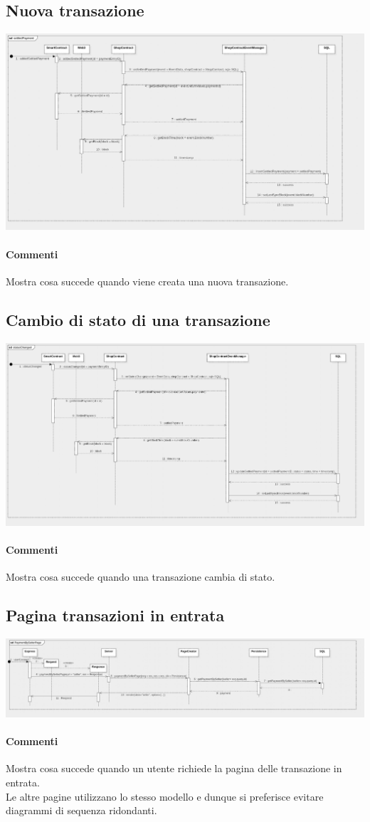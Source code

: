 \documentclass[a4paper, 12pt]{article}
\begin{document}
\subsection{Nuova transazione}
\includegraphics[width=1.0\textwidth]{settledPayment}
\paragraph{Commenti}
Mostra cosa succede quando viene creata una nuova transazione.

\subsection{Cambio di stato di una transazione}
\includegraphics[width=1.0\textwidth]{statusChanged}
\paragraph{Commenti}
Mostra cosa succede quando una transazione cambia di stato.

\subsection{Pagina transazioni in entrata}
\includegraphics[width=1.0\textwidth]{paymentBySellerPage}
\paragraph{Commenti}
Mostra cosa succede quando un utente richiede la pagina delle transazione in entrata.\\
Le altre pagine utilizzano lo stesso modello e dunque si preferisce evitare diagrammi di sequenza ridondanti.
\end{document}

